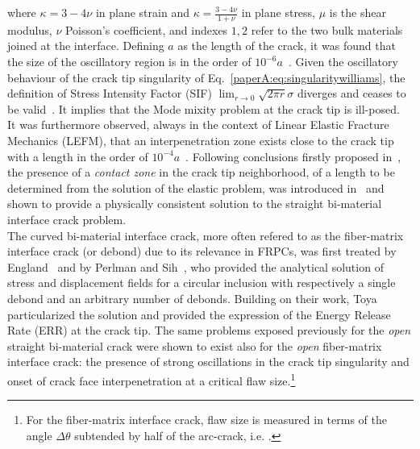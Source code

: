 where $\kappa=3-4\nu$ in plane strain and $\kappa=\frac{3-4\nu}{1+\nu}$ in plane stress, $\mu$ is the shear modulus, $\nu$ Poisson's coefficient, and indexes $1,2$ refer to the two bulk materials joined at the interface. Defining $a$ as the length of the crack, it was found that the size of the oscillatory region is in the order of $10^{-6}a$~\cite{Erdogan1963}. Given the oscillatory behaviour of the crack tip singularity of Eq.~\ref{paperA:eq:singularitywilliams}, the definition of Stress Intensity Factor (SIF) $\lim_{r\rightarrow 0}\sqrt{2\pi r}\sigma$ diverges and ceases to be valid~\cite{Comninou1990}. It implies that the Mode mixity problem at the crack tip is ill-posed.\\
It was furthermore observed, always in the context of Linear Elastic Fracture Mechanics (LEFM), that an interpenetration zone exists close to the crack tip~\cite{England1965,Malyshev1965} with a length in the order of $10^{-4}a$~\cite{England1965}. Following conclusions firstly proposed in~\cite{Malyshev1965}, the presence of a \emph{contact zone} in the crack tip neighborhood, of a length to be determined from the solution of the elastic problem, was introduced in~\cite{Comninou1977} and shown to provide a physically consistent solution to the straight bi-material interface crack problem.\\
The curved bi-material interface crack, more often refered to as the fiber-matrix interface crack (or debond) due to its relevance in FRPCs, was first treated by England~\cite{England1966} and by Perlman and Sih~\cite{Perlman1967}, who provided the analytical solution of stress and displacement fields for a circular inclusion with respectively a single debond and an arbitrary number of debonds. Building on their work, Toya~\cite{Toya1974} particularized the solution and provided the expression of the Energy Release Rate (ERR) at the crack  tip. The same problems exposed previously for the \emph{open} straight bi-material crack were shown to exist also for the \emph{open} fiber-matrix interface crack: the presence of strong oscillations in the crack tip singularity and onset of crack face interpenetration at a critical flaw size.\footnote{For the fiber-matrix interface crack, flaw size is measured in terms of the angle $\Delta\theta$ subtended by half of the arc-crack, i.e. .}\\
